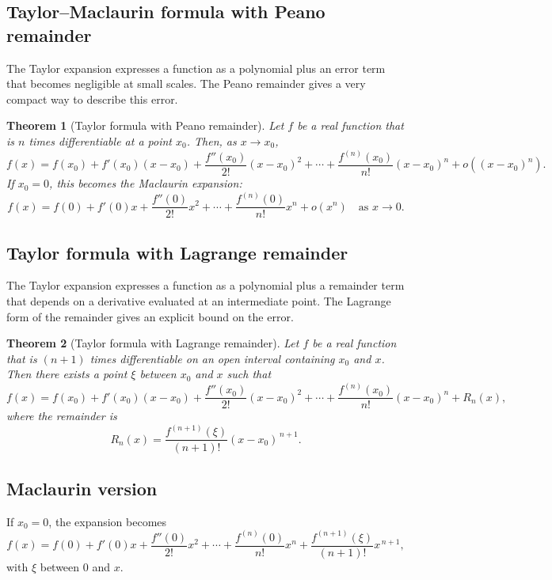 \documentclass[11pt,a4paper]{article}
\theoremstyle{definition} \newtheorem{definition}{Definition} \theoremstyle{plain} \newtheorem{theorem}{Theorem}
\begin{document}
\subsection{Taylor--Maclaurin formula with Peano remainder}\label{sec:taylor-peano}
The Taylor expansion expresses a function as a polynomial plus an error term that becomes negligible at small scales.
The Peano remainder gives a very compact way to describe this error.
\begin{theorem}[Taylor formula with Peano remainder]\label{thm:taylor-peano} Let $f$ be a real function that is $n$ times differentiable at a point $x_0$.
Then, as $x \to x_0$,
\[\boxed{ f(x) = f(x_0)
+ f'(x_0)(x - x_0)
+ \frac{f''(x_0)}{2!}(x - x_0)^2
+ \cdots
+ \frac{f^{(n)}(x_0)}{n!}(x - x_0)^n
+ o\!\left((x - x_0)^n\right). }\]
If $x_0 = 0$, this becomes the Maclaurin expansion:
\[ f(x) = f(0)
+ f'(0)x
+ \frac{f''(0)}{2!}x^2
+ \cdots
+ \frac{f^{(n)}(0)}{n!}x^n
+ o(x^n)
\quad \text{as } x \to 0. \]
\end{theorem}
\subsection{Taylor formula with Lagrange remainder}
The Taylor expansion expresses a function as a polynomial plus a remainder term that depends on a derivative evaluated at an intermediate point.
The Lagrange form of the remainder gives an explicit bound on the error.
\begin{theorem}[Taylor formula with Lagrange remainder]\label{thm:taylor-lagrange} Let $f$ be a real function that is $(n+1)$ times differentiable on an open interval containing $x_0$ and $x$.
Then there exists a point $\xi$ between $x_0$ and $x$ such that
\[ f(x) = f(x_0)
+ f'(x_0)(x - x_0)
+ \frac{f''(x_0)}{2!}(x - x_0)^2
+ \cdots
+ \frac{f^{(n)}(x_0)}{n!}(x - x_0)^n
+ R_n(x), \]
where the remainder is
\[ R_n(x) = \frac{f^{(n+1)}(\xi)}{(n+1)!}(x - x_0)^{\,n+1}. \]
\end{theorem}
\subsection*{Maclaurin version}
If $x_0 = 0$, the expansion becomes
\[ f(x) = f(0)
+ f'(0)x
+ \frac{f''(0)}{2!}x^2
+ \cdots
+ \frac{f^{(n)}(0)}{n!}x^n
+ \frac{f^{(n+1)}(\xi)}{(n+1)!}x^{\,n+1}, \]
with $\xi$ between $0$ and $x$.
\end{document}
